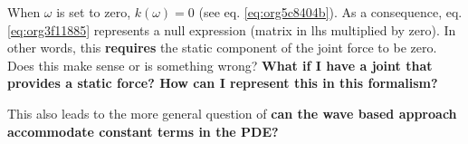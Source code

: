 \documentclass[11pt]{article}
\begin{document}
\begin{tcolorbox}[title={Question},colback=red!5!white,colframe=red!75!black, colbacktitle=yellow!50!red,coltitle=red!25!black, fonttitle=\bfseries,subtitle style={boxrule=0.4pt, colback=yellow!50!red!25!white}]
When \(\omega\) is set to zero, \(k(\omega)=0\) (see eq. \ref{eq:org5c8404b}). As a consequence, eq. \ref{eq:org3f11885} represents a null expression (matrix in lhs multiplied by zero). In other words, this \textbf{requires} the static component of the joint force to be zero. Does this make sense or is something wrong? \textbf{What if I have a joint that provides a static force? How can I represent this in this formalism?}

This also leads to the more general question of \textbf{can the wave based approach accommodate constant terms in the PDE?}

\end{tcolorbox}
\end{document}
